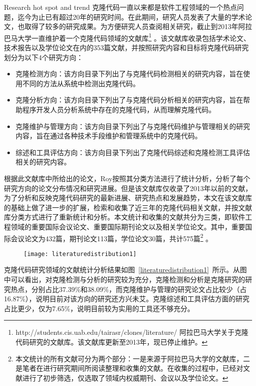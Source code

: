 {Research hot spot and trend}
克隆代码一直以来都是软件工程领域的一个热点问题，迄今为止已有超过20年的研究时间。在此期间，研究人员发表了大量的学术论文，也取得了较多的研究成果。为方便研究人员查阅相关研究，截止到2013年阿拉巴马大学一直维护着一个克隆代码领域的文献库\footnote{ http://students.cis.uab.edu/tairasr/clones/literature/ 阿拉巴马大学关于克隆代码研究的文献库。该文献库更新至2013年，现已停止维护。} 。该文献库收录包括学术论文、技术报告以及学位论文在内的353篇文献，并按照研究内容和目标将克隆代码研究划分为以下4个研究方向：
\begin{itemize}
\item {克隆检测方向：该方向目录下列出了与克隆代码检测相关的研究内容，旨在使用不同的方法从系统中检测出克隆代码。}
\item 克隆分析方向：该方向目录下列出了与克隆代码分析相关的研究内容，旨在帮助程序开发人员分析系统中存在的克隆代码，从而理解克隆代码。
\item 克隆维护与管理方向：该方向目录下列出了与克隆代码维护与管理相关的研究内容，旨在通过各种技术手段维护和管理系统中的克隆代码。
\item 综述和工具评估方向：该方向目录下列出了克隆代码综述和克隆检测工具评估相关的研究内容。
\end{itemize}

根据此文献库中所给出的论文，Roy按照其分类方法进行了统计分析，分析了每个研究方向的论文分布情况和研究进展\cite{roy2014vision}。但是该文献库仅收录了2013年以前的文献，为了分析和反映克隆代码研究的最新进展、研究热点和发展趋势，本文在该文献库的基础上做了进一步的扩展，检索和收集了近三年的克隆代码相关文献，并按文献库分类方式进行了重新统计和分析。本文统计和收集的文献共分为三类，即软件工程领域的重要国际会议论文、重要国际期刊论文以及相关学位论文。其中，重要国际会议论文为432篇，期刊论文113篇，学位论文30篇，共计575篇\footnote{本文统计的所有文献可分为两个部分：一是来源于阿拉巴马大学的文献库，二是笔者在进行研究期间所阅读整理和收集的文献。在收集的过程中，已经对文献进行了初步筛选，仅选取了领域内权威期刊、会议以及学位论文。} 。

\begin{figure}[htbp]
\centering
\texttt{[image: literaturedistribution1]}
\vspace{-1em}
\end{figure}

克隆代码研究领域的文献统计分析结果如图~\ref{literaturedistribution1}~所示。从图中可以看出，对克隆检测与分析的研究较为充分，克隆检测和分析是克隆研究的研究热点，分别占比37.39\%和38.09\%，而克隆维护与管理的研究论文占比较少（占16.87\%），说明目前对该方向的研究还方兴未艾。克隆综述和工具评估方面的研究占比更少，仅为7.65\%，说明目前较为实用的工具还不够充分。

